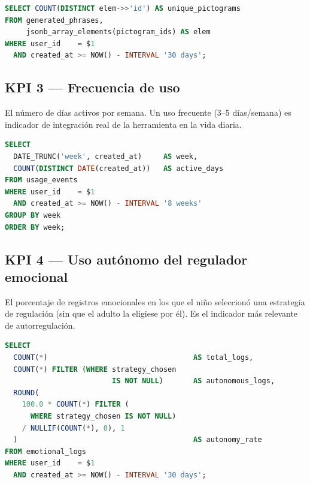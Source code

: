 \documentclass[12pt, a4paper]{article}
\begin{document}
\begin{cajatecnica}
\begin{lstlisting}[language=SQL]
SELECT COUNT(DISTINCT elem->>'id') AS unique_pictograms
FROM generated_phrases,
     jsonb_array_elements(pictogram_ids) AS elem
WHERE user_id    = $1
  AND created_at >= NOW() - INTERVAL '30 days';
\end{lstlisting}
\end{cajatecnica}

\subsection{KPI 3 --- Frecuencia de uso}

\begin{puntoclave}
El número de días activos por semana. Un uso frecuente (3--5 días/semana) es indicador de integración real de la herramienta en la vida diaria.
\end{puntoclave}

\begin{cajatecnica}
\begin{lstlisting}[language=SQL]
SELECT
  DATE_TRUNC('week', created_at)     AS week,
  COUNT(DISTINCT DATE(created_at))   AS active_days
FROM usage_events
WHERE user_id    = $1
  AND created_at >= NOW() - INTERVAL '8 weeks'
GROUP BY week
ORDER BY week;
\end{lstlisting}
\end{cajatecnica}

\subsection{KPI 4 --- Uso autónomo del regulador emocional}

\begin{puntoclave}
El porcentaje de registros emocionales en los que el niño seleccionó una estrategia de regulación (sin que el adulto la eligiese por él). Es el indicador más relevante de autorregulación.
\end{puntoclave}

\begin{cajatecnica}
\begin{lstlisting}[language=SQL]
SELECT
  COUNT(*)                                  AS total_logs,
  COUNT(*) FILTER (WHERE strategy_chosen
                         IS NOT NULL)       AS autonomous_logs,
  ROUND(
    100.0 * COUNT(*) FILTER (
      WHERE strategy_chosen IS NOT NULL)
    / NULLIF(COUNT(*), 0), 1
  )                                         AS autonomy_rate
FROM emotional_logs
WHERE user_id    = $1
  AND created_at >= NOW() - INTERVAL '30 days';
\end{lstlisting}
\end{cajatecnica}
\end{document}
